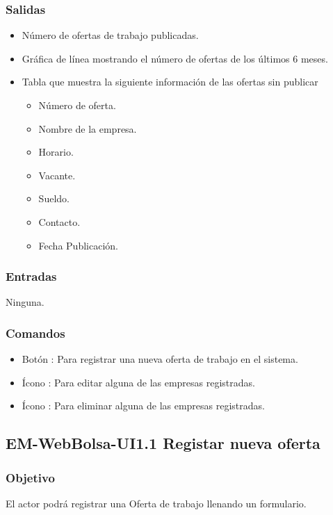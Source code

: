 \subsubsection{Salidas}
\begin{itemize}
			\item Número de ofertas de trabajo publicadas.
			\item Gráfica de línea mostrando el número de ofertas de los últimos 6 meses.
			\item Tabla que muestra la siguiente información de las ofertas sin publicar
				\begin{itemize}
         		\item Número de oferta.
				\item Nombre de la empresa.
				\item Horario.
				\item Vacante.
				\item Sueldo.
				\item Contacto.
				\item Fecha Publicación.
				\end{itemize}	
			\end{itemize}

\subsubsection{Entradas}
	\noindent
	Ninguna.

\subsubsection{Comandos}
\begin{itemize}
		\item Botón : Para registrar una nueva oferta de trabajo en el sistema.  
		\item Ícono : Para editar alguna de las empresas registradas.
		\item Ícono : Para eliminar alguna de las empresas registradas.
	\end{itemize}

	
\subsection{EM-WebBolsa-UI1.1 Registar nueva oferta}

\subsubsection{Objetivo}
	\noindent
	El actor podrá registrar una Oferta de trabajo llenando un formulario.

